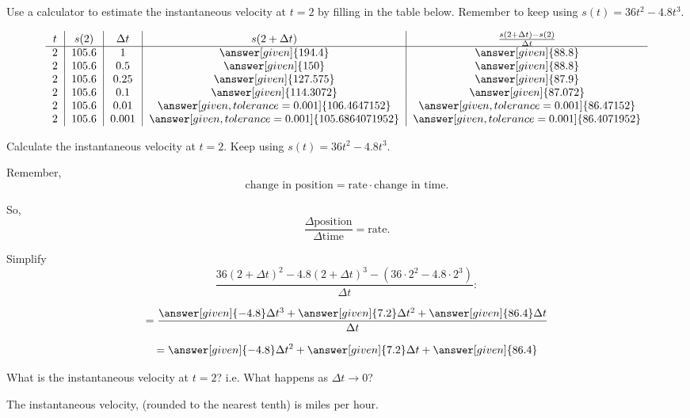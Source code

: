 \documentclass{ximera}
\begin{document}
\begin{problem}
  Use a calculator to estimate the instantaneous velocity at $t=2$ by filling in the table below. Remember to keep using $s(t)=36t^2-4.8t^3$.
  
  \[
\begin{tabular}{c|c|c|c|c}
 $t$ & $s(2)$ & $\Delta t$ & $s(2+\Delta t)$ & $\frac{s(2+\Delta t)-s(2)}{\Delta t}$\\ \hline
$2$ & $105.6$ & $1$ & $\answer[given]{194.4}$ & $\answer[given]{88.8}$\\
$2$ & $105.6$ & $0.5$ & $\answer[given]{150}$ & $\answer[given]{88.8}$\\
$2$ & $105.6$ & $0.25$ & $\answer[given]{127.575}$ & $\answer[given]{87.9}$\\
$2$ & $105.6$ & $0.1$ & $\answer[given]{114.3072}$ & $\answer[given]{87.072}$\\
$2$ & $105.6$ & $0.01$ & $\answer[given, tolerance=0.001]{106.4647152}$ & $\answer[given, tolerance=0.001]{86.47152}$\\
$2$ & $105.6$ & $0.001$ & $\answer[given, tolerance=0.001]{105.6864071952}$ & $\answer[given, tolerance=0.001]{86.4071952}$\\
\end{tabular}
\]

\end{problem}

\begin{problem}
  Calculate the instantaneous velocity at $t=2$. Keep using $s(t)=36t^2-4.8t^3$.
  \begin{hint}
    Remember, 
    \[
    \text{change in position} = \text{rate}\cdot\text{change in time}.
    \]
  \end{hint}
  \begin{hint}
    So, 
    \[
    \frac{\Delta\text{position}}{\Delta\text{time}} = \text{rate}.
    \]
  \end{hint}
  \begin{hint}
    Simplify
    \[
    \frac{36(2+\Delta t)^2 -4.8(2+\Delta t)^3 -\left(36\cdot 2^2 -4.8\cdot 2^3\right) }{\Delta t}:
    \]
    
    \[
    =\frac{\answer[given]{-4.8}\Delta t^3+\answer[given]{7.2}\Delta t^2+\answer[given]{86.4}\Delta t}{\Delta t}
    \]
    
    \[
    =\answer[given]{-4.8}\Delta t^2+\answer[given]{7.2}\Delta t+\answer[given]{86.4}
    \]
    
    What is the instantaneous velocity at $t=2$? i.e. What happens as $\Delta t\rightarrow 0$?
    
  \end{hint}
  \begin{prompt}
    The instantaneous velocity, (rounded to the nearest tenth) is  miles per hour.
  \end{prompt}
\end{problem}
\end{document}
